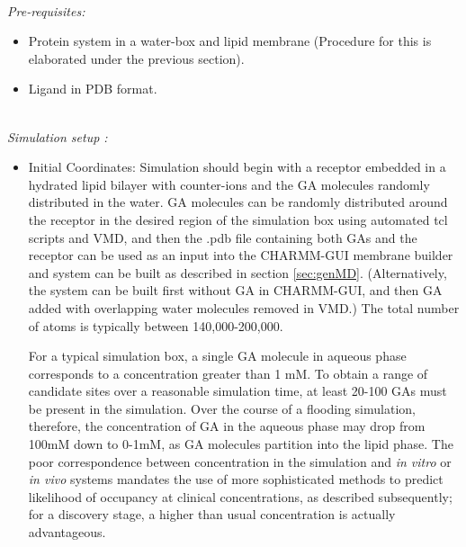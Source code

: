 \documentclass[12pt]{article}
\begin{document}
\hfill \break
\\
\textit{Pre-requisites:} 
\begin{itemize}
  \item Protein system in a water-box and lipid membrane (Procedure for this is elaborated under the previous section).
  \item Ligand in PDB format.
\end{itemize} \hfill \break
\\
\textit {Simulation setup :}
\begin{itemize}
  \item Initial Coordinates: Simulation should begin with a receptor embedded in a hydrated lipid bilayer with counter-ions and the GA molecules randomly distributed in the water.  GA molecules can be randomly distributed around the receptor in the desired region of the simulation box using automated tcl scripts and VMD, and then the .pdb file containing both GAs and the receptor can be used as an input into the CHARMM-GUI membrane builder and system can be built as described in section \ref{sec:genMD}.
 (Alternatively, the system can be built first without GA in CHARMM-GUI, and then GA added with overlapping water molecules removed in VMD.) %
 The total number of atoms is typically between 140,000-200,000.  
  
For a typical simulation box, a single GA molecule in aqueous phase corresponds to a concentration greater than 1 mM.   To obtain a range of candidate sites over a reasonable simulation time, at least 20-100 GAs must be present in the simulation.  Over the course of a flooding simulation, therefore, the concentration of GA in the aqueous phase may drop from 100mM down to 0-1mM, as GA molecules partition into the lipid phase.   The poor correspondence between concentration in the simulation and {\it in vitro} or {\it in vivo} systems mandates the use of more sophisticated methods to predict likelihood of occupancy at clinical concentrations, as described subsequently; for a discovery stage, a higher than usual concentration is actually advantageous.   


\end{itemize}
\end{document}
